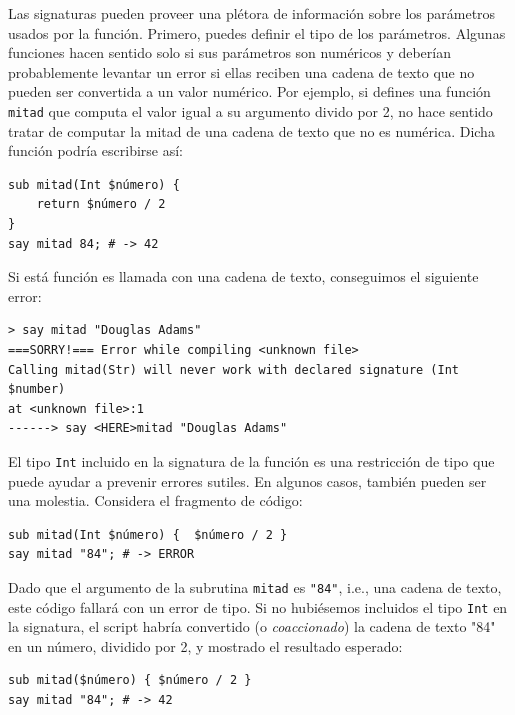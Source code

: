 Las signaturas pueden proveer una plétora de información
sobre los parámetros usados por la función. Primero, puedes
definir el tipo de los parámetros. Algunas funciones hacen 
sentido solo si sus parámetros son numéricos y deberían
probablemente levantar un error si ellas reciben una
cadena de texto que no pueden ser convertida a un valor
numérico. Por ejemplo, si defines una función {\tt mitad}
que computa el valor igual a su argumento divido por 2,
no hace sentido tratar de computar la mitad de una
cadena de texto que no es numérica. Dicha función
podría escribirse así:

\begin{lstlisting}
sub mitad(Int $número) { 
    return $número / 2 
}
say mitad 84; # -> 42
\end{lstlisting}

Si está función es llamada con una cadena de texto,
conseguimos el siguiente error:

\begin{lstlisting}
> say mitad "Douglas Adams"
===SORRY!=== Error while compiling <unknown file>
Calling mitad(Str) will never work with declared signature (Int $number)
at <unknown file>:1
------> say <HERE>mitad "Douglas Adams"
\end{lstlisting}

El tipo {\tt Int} incluido en la signatura de la función es
una restricción de tipo que puede ayudar a prevenir errores
sutiles. En algunos casos, también pueden ser una molestia.
Considera el fragmento de código:


\begin{lstlisting}
sub mitad(Int $número) {  $número / 2 }
say mitad "84"; # -> ERROR
\end{lstlisting}

Dado que el argumento de la subrutina {\tt mitad} es {\tt "84"},
i.e., una cadena de texto, este código fallará con un error de 
tipo. Si no hubiésemos incluidos el tipo {\tt Int} en la signatura,
el script habría convertido (o \emph{coaccionado}) la cadena de
texto "84" en un número, dividido por 2, y mostrado el
resultado esperado:

\begin{lstlisting}
sub mitad($número) { $número / 2 }
say mitad "84"; # -> 42
\end{lstlisting}

